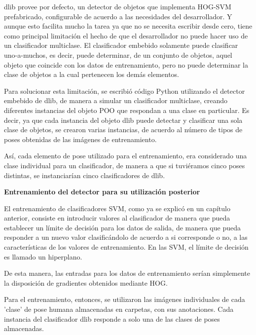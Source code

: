 \documentclass[a4paper,12pt,oneside,spanish]{book}
\begin{document}
dlib provee por defecto, un detector de objetos que implementa HOG-SVM prefabricado, configurable de acuerdo a las necesidades del desarrollador. Y aunque esto facilita mucho la tarea ya que no se necesita escribir desde cero, tiene como principal limitación el hecho de que el desarrollador no puede hacer uso de un clasificador multiclase. El clasificador embebido solamente puede clasificar uno-a-muchos, es decir, puede determinar, de un conjunto de objetos, aquel objeto que coincide con los datos de entrenamiento, pero no puede determinar la clase de objetos a la cual pertenecen los demás elementos.\par

Para solucionar esta limitación, se escribió código Python utilizando el detector embebido de dlib, de manera a simular un clasificador multiclase, creando diferentes instancias del objeto POO que respondan a una clase en particular. Es decir, ya que cada instancia del objeto dlib puede detectar y clasificar una sola clase de objetos, se crearon varias instancias, de acuerdo al número de tipos de poses obtenidas de las imágenes de entrenamiento.\par

Así, cada elemento de pose utilizado para el entrenamiento, era considerado una clase individual para un clasificador, de manera a que si tuviéramos cinco poses distintas, se instanciarían cinco clasificadores de dlib.\par

	
\textbf{Entrenamiento del detector para su utilización posterior}\par
El entrenamiento de clasificadores SVM, como ya se explicó en un capítulo anterior, consiste en introducir valores al clasificador de manera que pueda establecer un límite de decisión para los datos de salida, de manera que pueda responder a un nuevo valor clasificándolo de acuerdo a si corresponde o no, a las características de los valores de entrenamiento. En las SVM, el límite de decisión es llamado un hiperplano.\par

De esta manera, las entradas para los datos de entrenamiento serían simplemente la disposición de gradientes obtenidos mediante HOG.\par

Para el entrenamiento, entonces, se utilizaron las imágenes individuales de cada 'clase' de pose humana almacenadas en carpetas, con sus anotaciones. Cada instancia del clasificador dlib responde a solo una de las clases de poses almacenadas. \par
\end{document}
